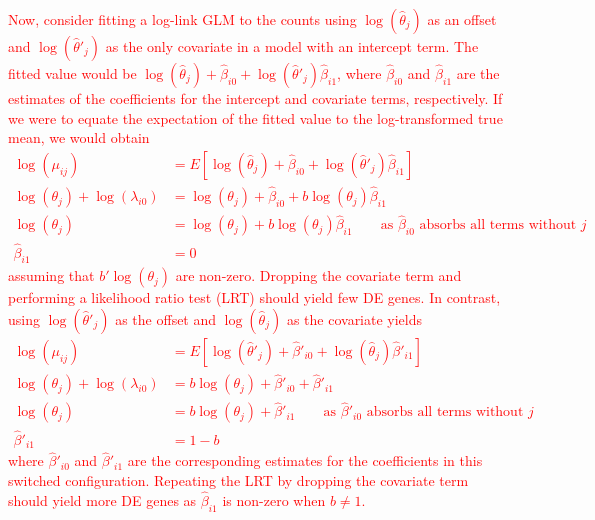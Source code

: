 \documentclass{article}
\newcommand\revised[1]{\textcolor{red}{#1}}
\begin{document}
\revised{Now, consider fitting a log-link GLM to the counts using $\log(\hat\theta_j)$ as an offset and $\log(\hat\theta'_j)$ as the only covariate in a model with an intercept term.
The fitted value would be $\log(\hat\theta_j) + \hat\beta_{i0} + \log(\hat\theta'_j)\hat\beta_{i1}$, where $\hat\beta_{i0}$ and $\hat\beta_{i1}$ are the estimates of the coefficients for the intercept and covariate terms, respectively.
If we were to equate the expectation of the fitted value to the log-transformed true mean, we would obtain
\begin{align*}
    \log(\mu_{ij}) &= E[\log(\hat\theta_j) + \hat\beta_{i0} + \log(\hat\theta'_j)\hat\beta_{i1}] \\
    \log(\theta_j) + \log(\lambda_{i0}) &=  \log(\theta_j) + \hat\beta_{i0} + b \log(\theta_j) \hat\beta_{i1} \\
    \log(\theta_j) &=  \log(\theta_j) + b \log(\theta_j)\hat\beta_{i1} \qquad\mbox{as $\hat\beta_{i0}$ absorbs all terms without $j$}\\
    \hat\beta_{i1} &= 0 
\end{align*}
assuming that $b' \log(\theta_j)$ are non-zero. 
Dropping the covariate term and performing a likelihood ratio test (LRT) should yield few DE genes.
In contrast, using $\log(\hat\theta'_j)$ as the offset and $\log(\hat\theta_j)$ as the covariate yields 
\begin{align*}
    \log(\mu_{ij}) &= E[\log(\hat\theta'_j) + \hat\beta'_{i0} + \log(\hat\theta_j)\hat\beta'_{i1}] \\
    \log(\theta_j) + \log(\lambda_{i0}) &=  b\log(\theta_j) + \hat\beta'_{i0} + \hat\beta'_{i1} \\
    \log(\theta_j) &=  b\log(\theta_j) + \hat\beta'_{i1} \qquad\mbox{as $\hat\beta'_{i0}$ absorbs all terms without $j$}\\
    \hat\beta'_{i1} &= 1- b
\end{align*}
where $\hat\beta'_{i0}$ and $\hat\beta'_{i1}$ are the corresponding estimates for the coefficients in this switched configuration.
Repeating the LRT by dropping the covariate term should yield more DE genes as $\hat\beta_{i1}$ is non-zero when $b\neq1$.}
\end{document}
